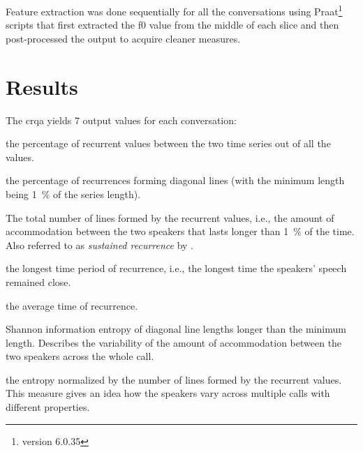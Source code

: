 Feature extraction was done sequentially for all the conversations using Praat\footnote{version 6.0.35} \citep{Boersma2001praat} scripts that first extracted the \ac{f0} value from the middle of each slice and then post-processed the output to acquire cleaner measures.

\section{Results}
\label{sec:results}

The \ac{crqa} yields 7 output values for each conversation:

\begin{description}
	\item[\Acf{rr}] the percentage of recurrent values between the two time series out of all the values.
	\item[Percentage determinism (DET)] the percentage of recurrences forming diagonal lines (with the minimum length being \SI{1}{\percent} of the series length).
	\item[number of lines (NRLINE)] The total number of lines formed by the recurrent values, i.e., the amount of accommodation between the two speakers that lasts longer than \SI{1}{\percent} of the time.
	Also referred to as \emph{sustained recurrence} by \citet{Borrie2019syncing}.
	\item[Maximal length (maxL)] the longest time period of recurrence, i.e., the longest time the speakers' speech remained close.
	\item[Average length (L)] the average time of recurrence.
	\item[Entropy (ENTR)] Shannon information entropy of diagonal line lengths longer than the minimum length.
	Describes the variability of the amount of accommodation between the two speakers across the whole call.
	\item[Normalized entropy (rENTR)] the entropy normalized by the number of lines formed by the recurrent values.
	This measure gives an idea how the speakers vary across multiple calls with different properties.
\end{description}

